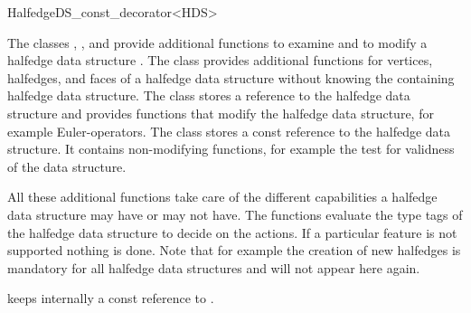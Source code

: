 
\ccRefPageBegin



\begin{ccRefClass}{HalfedgeDS_const_decorator<HDS>}
\label{pageHalfedgeDSconstDecoratorRef}

\ccDefinition
  
The classes ,
, and
 provide additional functions
to examine and to modify a halfedge data structure . The class
 provides additional functions
for vertices, halfedges, and faces of a halfedge data structure
without knowing the containing halfedge data structure. The class
 stores a reference to the halfedge
data structure and provides functions that modify the halfedge data
structure, for example Euler-operators. The class
 stores a const reference to
the halfedge data structure. It contains non-modifying functions, for
example the test for validness of the data structure.

All these additional functions take care of the different capabilities
a halfedge data structure may have or may not have.  The functions
evaluate the type tags of the halfedge data structure to decide on the
actions. If a particular feature is not supported nothing is done.
Note that for example the creation of new halfedges is mandatory for
all halfedge data structures and will not appear here again.


\ccInheritsFrom


\ccCreation
{}

\ccTagFullDeclarations
{}
    {keeps internally a const reference to .}
\ccTagDefaults



\end{ccRefClass}
